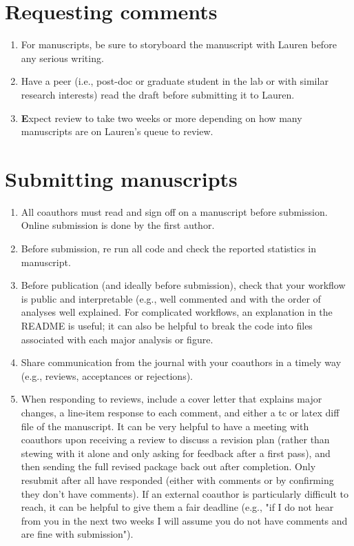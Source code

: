 \documentclass[12pt]{article}
\begin{document}
\section{Requesting comments}
\begin{enumerate}
\item For manuscripts, be sure to storyboard the manuscript with
  Lauren before any serious writing.
\item Have a peer (i.e., post-doc or graduate student in the lab or
  with similar research interests) read the draft before submitting it
  to Lauren.
\item \textbf Expect review to take two weeks or more depending on how many manuscripts are on Lauren's queue to review.
\end{enumerate}

\section{Submitting manuscripts}
\begin{enumerate}
\item All coauthors must read and sign off on a manuscript before
  submission. Online submission is done by the first author.
\item Before submission, re run all code and check the reported statistics in
  manuscript.
\item Before publication (and ideally before submission), check that your workflow is public and interpretable (e.g., well commented and with the order of analyses well explained. For complicated workflows, an explanation in the README is useful; it can also be helpful to break the code into files associated with each major analysis or figure.
\item Share communication from the journal with your coauthors in a timely way (e.g., reviews, acceptances or rejections).
\item When responding to reviews, include a cover letter that explains major changes, a line-item response to each comment, and either a tc or latex diff file of the manuscript. It can be very helpful to have a meeting with coauthors upon receiving a review to discuss a revision plan (rather than stewing with it alone and only asking for feedback after a first pass), and then sending the full revised package back out after completion. Only resubmit after all have responded (either with comments or by confirming they don't have comments). If an external coauthor is particularly difficult to reach, it can be helpful to give them a fair deadline (e.g., "if I do not hear from you in the next two weeks I will assume you do not have comments and are fine with submission").
\end{enumerate}
\end{document}
